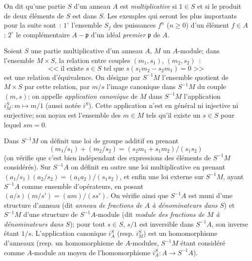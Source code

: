 \begin{env}[1.2.1]
\label{0.1.2.1-fr}
On dit qu'une partie $S$ d'un anneau $A$ est \emph{multiplicative} si $1\in S$ et si le produit de deux éléments de $S$ est dans $S$.
Les exemples qui seront les plus importants pour la suite sont~: $1^\circ$ l'ensemble $S_f$ des puissances $f^n$ ($n\geq 0$) d'un élément $f\in A$; $2^\circ$ le complémentaire $A-\mathfrak{p}$ d'un idéal \emph{premier} $\mathfrak{p}$ de $A$.
\end{env}

\begin{env}[1.2.2]
\label{0.1.2.2-fr}
Soient $S$ une partie multiplicative d'un anneau $A$, $M$ un $A$-module; dans l'ensemble $M\times S$, la relation entre couples $(m_1,s_1)$, $(m_2,s_2)$~:
\[
  \text{<<~il existe $s\in S$ tel que $s(s_1m_2-s_2m_1)=0$~>>}
\]
est une relation d'équivalence.
On désigne par $S^{-1}M$ l'ensemble quotient de $M\times S$ par cette relation, par $m/s$ l'image canonique dans $S^{-1}M$ du couple $(m,s)$; on appelle \emph{application canonique} de $M$ dans $S^{-1}M$ l'application $i_M^S:m\mapsto m/1$ (aussi notée $i^S$).
Cette application n'est en général ni injective ni surjective; son noyau est l'ensemble des $m\in M$ tels qu'il existe un $s\in S$ pour lequel $sm=0$.

Dans $S^{-1}M$ on définit une loi de groupe additif en prenant
\[
  (m_1/s_1)+(m_2/s_2)=(s_2m_1+s_1m_2)/(s_1s_2)
\]
(on vérifie que c'est bien indépendant des expressions des éléments de $S^{-1}M$ considérés).
Sur $S^{-1}A$ on définit en outre une loi multiplicative en prenant $(a_1/s_1)(a_2/s_2)=(a_1a_2)/(s_1s_2)$, et enfin une loi externe sur $S^{-1}M$, ayant $S^{-1}A$ comme ensemble d'opérateurs, en posant $(a/s)(m/s')=(am)/(ss')$.
On vérifie ainsi que $S^{-1}A$ est muni d'une structure d'anneau (dit \emph{anneau de fractions de $A$ à dénominateurs dans $S$}) et $S^{-1}M$ d'une structure de $S^{-1}A$-module (dit \emph{module des fractions de $M$ à dénominateurs dans $S$}); pour tout $s\in S$, $s/1$ est inversible dans $S^{-1}A$, son inverse étant $1/s$.
L'application canonique $i_A^S$ (resp. $i_M^S$) est un homomorphisme d'anneaux (resp. un homomorphisme de $A$-modules, $S^{-1}M$ étant considéré comme $A$-module au moyen de l'homomorphisme $i_A^S:A\to S^{-1}A$).
\end{env}


